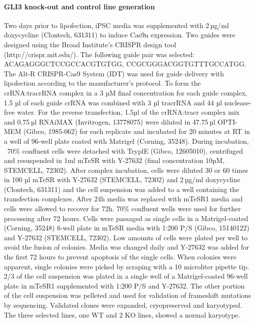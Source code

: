 \paragraph{GLI3 knock-out and control line generation}
Two days prior to lipofection, iPSC media was supplemented with 2 µg/ml doxycycline (Clontech, 631311) to induce Cas9n expression. Two guides were designed using the Broad Institute’s CRISPR design tool (http://crispr.mit.edu/). The following guide pair was selected: ACAGAGGGCTCCGCCACGTGTGG, CCGCGGGACGGTGTTTGCCATGG. The Alt-R CRISPR-Cas9 System (IDT) was used for guide delivery with lipofection according to the manufacturer's protocol. To form the crRNA:tracrRNA complex in a 3 µM final concentration for each guide complex, 1.5 µl of each guide crRNA was combined with 3 µl tracrRNA and 44 µl nuclease-free water. For the reverse transfection, 1.5µl of the crRNA:tracr complex mix and  0.75 µl RNAiMAX (Invitrogen, 13778075) were diluted in 47.75 µl OPTI-MEM (Gibco, 1985-062) for each replicate and incubated for 20 minutes at RT in a well of 96-well plate coated with Matrigel (Corning, 35248). During incubation, ~70\% confluent cells were detached with TryplE (Gibco, 12605010), centrifuged and resuspended in 1ml mTeSR with Y-27632 (final concentration 10µM, STEMCELL, 72302). After complex incubation, cells were diluted 30 or 60 times in 100 µl mTeSR with  Y-27632 (STEMCELL, 72302) and 2 µg/ml doxycycline (Clontech, 631311) and the cell suspension was added to a well containing the transfection complexes. After 24h media was replaced with mTeSR1 media and cells were allowed to recover for 72h. 70\% confluent wells were used for further processing after 72 hours. Cells were passaged as single cells in a Matrigel-coated (Corning, 35248) 6-well plate in mTeSR media with 1:200 P/S (Gibco, 15140122) and Y-27632 (STEMCELL, 72302). Low amounts of cells were plated per well to avoid the fusion of colonies. Media was changed daily and Y-27632 was added for the first 72 hours to prevent apoptosis of the single cells. When colonies were apparent, single colonies were picked by scraping with a 10 microliter pipette tip. 2/3 of the cell suspension was plated in a single well of a Matrigel-coated 96-well plate in mTeSR1 supplemented with 1:200 P/S and Y-27632. The other portion of the cell suspension was pelleted and used for validation of frameshift mutations by sequencing. Validated clones were expanded, cryopreserved and karyotyped. The three selected lines, one WT and 2 KO lines, showed a normal karyotype.
 
